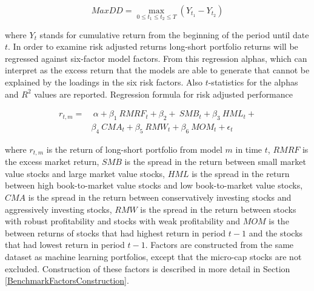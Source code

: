 \documentclass[12pt]{article}
\begin{document}
\begin{equation}
\label{eq:maxDD}
MaxDD = \max\limits_{0\leq t_1\leq t_2\leq T} (Y_{t_1} - Y_{t_2})
\end{equation}

where $Y_t$ stands for cumulative return from the beginning of the period until date $t$. In order to examine risk adjusted returns long-short portfolio returns will be regressed against \citet{FAMA20151} six-factor model factors\footnotemark. From this regression alphas, which can interpret as the excess return that the models are able to generate that cannot be explained by the loadings in the six risk factors. Also $t$-statistics for the alphas and $R^2$ values are reported. Regression formula for risk adjusted performance \par

\begin{equation}
\label{eq:FFRegFormula}
\begin{split}
r_{t, m} = 	& \ \alpha+ \beta_{1} \ RMRF_{t} + \beta_{2} + \ SMB_{t} + \beta_{3} \ HML_{t} + \\
		&  \beta_{4} \ CMA_{t} +  \beta_{5} \ RMW_{t} + \beta_{6} \ MOM_{t} + \epsilon_{t}
\end{split}
\end{equation}

where $r_{t, m}$ is the return of long-short portfolio from model $m$ in time $t$, $RMRF$ is the excess market return, $SMB$ is the spread in the return between small market value stocks and large market value stocks, $HML$ is the spread in the return between high book-to-market value stocks and low book-to-market value stocks, $CMA$ is the spread in the return between conservatively investing stocks and aggressively investing stocks, $RMW$ is the spread in the return between stocks with robust profitability and stocks with weak profitability and $MOM$ is the between returns of stocks that had highest return in period $t-1$ and the stocks that had lowest return in period $t-1$. Factors are constructed from the same dataset as machine learning portfolios, except that the micro-cap stocks are not excluded. Construction of these factors is described in more detail in Section \ref{BenchmarkFactorsConstruction}. \par

\end{document}

